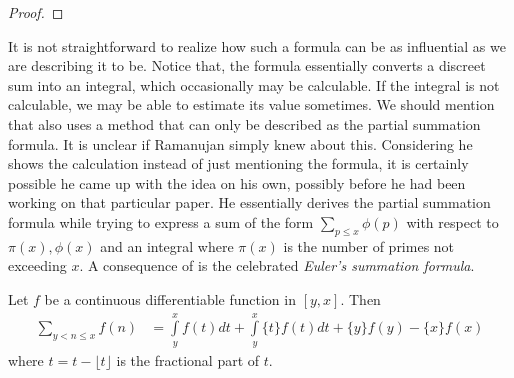 \documentclass[elemannt.tex]{subfile}
\begin{document}
		\begin{proof}
			
		\end{proof}
	It is not straightforward to realize how such a formula can be as influential as we are describing it to be. Notice that, the formula essentially converts a discreet sum into an integral, which occasionally may be calculable. If the integral is not calculable, we may be able to estimate its value sometimes. We should mention that \textcite[Page $83$, $\S4$]{aiyangar_hardy_vennkatesvara_seshu_aiyar_p_wilson_1927} also uses a method that can only be described as the partial summation formula. It is unclear if Ramanujan simply knew about this. Considering he shows the calculation instead of just mentioning the formula, it is certainly possible he came up with the idea on his own, possibly before he had been working on that particular paper. He essentially derives the partial summation formula while trying to express a sum of the form $\sum_{p\leq x}\phi(p)$ with respect to $\pi(x),\phi(x)$ and an integral where $\pi(x)$ is the number of primes not exceeding $x$. A consequence of  is the celebrated \textit{Euler's summation formula}.
		\begin{theorem}\label{thm:eulersum}
			Let $f$ be a continuous differentiable function in $[y,x]$. Then
				\begin{align*}
					\sum_{y<n\leq x}f(n)
						& = \int\limits_{y}^{x}f(t)dt+\int\limits_{y}^{x}\{t\}f(t)dt+\{y\}f(y)-\{x\}f(x)
				\end{align*}
			where ${t}=t-\lfloor{t}\rfloor$ is the fractional part of $t$.
		\end{theorem}
	
\end{document}
